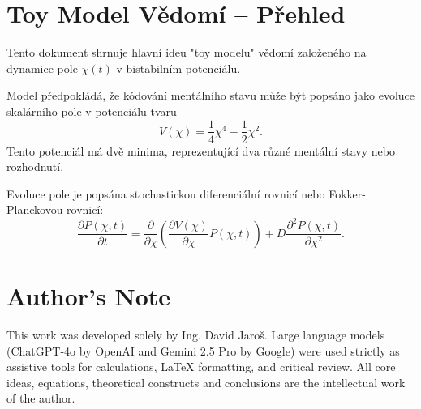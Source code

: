 \documentclass{article}
\begin{document}
\section*{Toy Model Vědomí – Přehled}

Tento dokument shrnuje hlavní ideu "toy modelu" vědomí založeného na dynamice pole $\chi(t)$ v bistabilním potenciálu.

Model předpokládá, že kódování mentálního stavu může být popsáno jako evoluce skalárního pole v potenciálu tvaru
\[
V(\chi) = \frac{1}{4} \chi^4 - \frac{1}{2} \chi^2.
\]
Tento potenciál má dvě minima, reprezentující dva různé mentální stavy nebo rozhodnutí.

Evoluce pole je popsána stochastickou diferenciální rovnicí nebo Fokker-Planckovou rovnicí:
\[
\frac{\partial P(\chi, t)}{\partial t} = \frac{\partial}{\partial \chi} \left( \frac{\partial V(\chi)}{\partial \chi} P(\chi, t) \right) + D \frac{\partial^2 P(\chi, t)}{\partial \chi^2}.
\]


\section*{Author's Note}

This work was developed solely by Ing. David Jaroš.  
Large language models (ChatGPT-4o by OpenAI and Gemini 2.5 Pro by Google) were used strictly as assistive tools for calculations, LaTeX formatting, and critical review.  
All core ideas, equations, theoretical constructs and conclusions are the intellectual work of the author.
\end{document}
